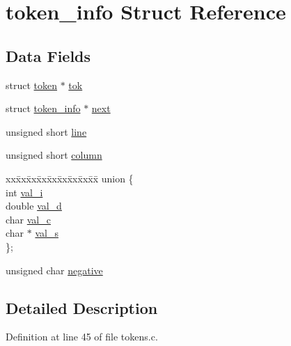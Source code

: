 \hypertarget{structtoken__info}{}\section{token\+\_\+info Struct Reference}
\label{structtoken__info}
\subsection*{Data Fields}
\begin{DoxyCompactItemize}
\item 
struct \mbox{\hyperlink{structtoken}{token}} $\ast$ \mbox{\hyperlink{structtoken__info_a55f2da03def99d2cd8adb1f2d5cb1eb9}{tok}}
\item 
struct \mbox{\hyperlink{structtoken__info}{token\+\_\+info}} $\ast$ \mbox{\hyperlink{structtoken__info_a8ae533e40ed837711592f2ccd0fbdaa7}{next}}
\item 
unsigned short \mbox{\hyperlink{structtoken__info_a12da61ba70beb7fda26fb3c1703b7b12}{line}}
\item 
unsigned short \mbox{\hyperlink{structtoken__info_aa711ac8c1fc3d2cc6a64e13bda8993f4}{column}}
\item 
\begin{tabbing}
xx\=xx\=xx\=xx\=xx\=xx\=xx\=xx\=xx\=\kill
union \{\\
\>int \mbox{\hyperlink{structtoken__info_a5aca99878d252001e7155853bef92c02}{val\_i}}\\
\>double \mbox{\hyperlink{structtoken__info_aec49de79a01a725b253eaeceb7e6b22c}{val\_d}}\\
\>char \mbox{\hyperlink{structtoken__info_a0928ec52e0db63dd228e929167c777cd}{val\_c}}\\
\>char $\ast$ \mbox{\hyperlink{structtoken__info_aa00629ea53975a7720bbe8c50637ce1c}{val\_s}}\\
\}; \\

\end{tabbing}\item 
unsigned char \mbox{\hyperlink{structtoken__info_aaf4c2889c4560c02792fa4cf4b0fe522}{negative}}
\end{DoxyCompactItemize}


\subsection{Detailed Description}


Definition at line 45 of file tokens.\+c.



